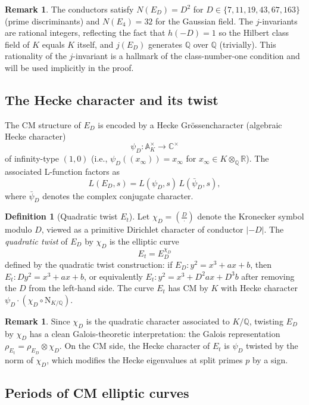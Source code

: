 \documentclass[12pt,a4paper]{article}
\theoremstyle{plain}
\theoremstyle{definition}
\newtheorem{definition}[theorem]{Definition}
\newtheorem{remark}[theorem]{Remark}
\newcommand{\Q}{\mathbb{Q}}
\newcommand{\C}{\mathbb{C}}
\newcommand{\R}{\mathbb{R}}
\newcommand{\NormKQ}{\mathrm{N}_{K/\Q}}
\begin{document}
\begin{remark}
The conductors satisfy $N(E_D) = D^2$ for $D \in \{7, 11, 19, 43, 67, 163\}$
(prime discriminants) and $N(E_4) = 32$ for the Gaussian field.
The $j$-invariants are rational integers, reflecting the fact that $h(-D) = 1$
so the Hilbert class field of $K$ equals $K$ itself, and $j(E_D)$ generates
$\Q$ over $\Q$ (trivially).  This rationality of the $j$-invariant is a
hallmark of the class-number-one condition and will be used implicitly in the
proof.
\end{remark}

\subsection{The Hecke character and its twist}

The CM structure of $E_D$ is encoded by a Hecke Gr\"ossencharacter
(algebraic Hecke character)
\[
  \psi_D : \mathbb{A}_K^\times \longrightarrow \C^\times
\]
of infinity-type $(1, 0)$ (i.e., $\psi_D((x_\infty)) = x_\infty$ for
$x_\infty \in K \otimes_\Q \R$).  The associated L-function factors as
\[
  L(E_D, s) = L(\psi_D, s) \, L(\bar\psi_D, s),
\]
where $\bar\psi_D$ denotes the complex conjugate character.

\begin{definition}[Quadratic twist $E_t$]
\label{def:Et}
Let $\chi_D = \left(\frac{D}{\cdot}\right)$ denote the Kronecker symbol
modulo $D$, viewed as a primitive Dirichlet character of conductor $|{-D}|$.
The \emph{quadratic twist} of $E_D$ by $\chi_D$ is the elliptic curve
\[
  E_t = E_D^{\chi_D}
\]
defined by the quadratic twist construction: if $E_D : y^2 = x^3 + ax + b$,
then $E_t : Dy^2 = x^3 + ax + b$, or equivalently
$E_t : y^2 = x^3 + D^2 a x + D^3 b$ after removing the $D$ from the
left-hand side.  The curve $E_t$ has CM by $K$ with Hecke character
$\psi_D \cdot (\chi_D \circ \NormKQ)$.
\end{definition}

\begin{remark}
Since $\chi_D$ is the quadratic character associated to $K/\Q$, twisting
$E_D$ by $\chi_D$ has a clean Galois-theoretic interpretation: the Galois
representation $\rho_{E_t} = \rho_{E_D} \otimes \chi_D$.  On the CM side,
the Hecke character of $E_t$ is $\psi_D$ twisted by the norm of $\chi_D$,
which modifies the Hecke eigenvalues at split primes $p$ by a sign.
\end{remark}

\subsection{Periods of CM elliptic curves}
\end{document}
